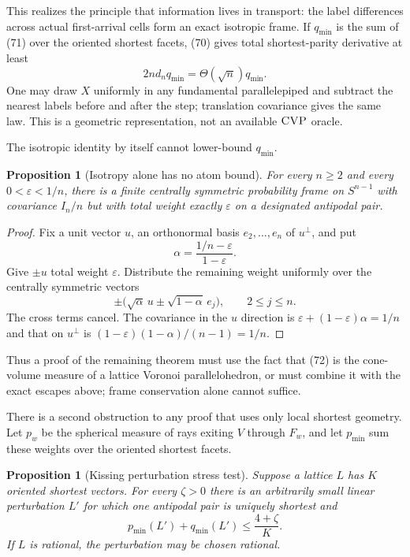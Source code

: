 \documentclass[10pt]{article}
\newtheorem{proposition}[theorem]{Proposition}
\theoremstyle{definition}
\newcommand{\CVP}{\textnormal{\textsc{CVP}}}
\begin{document}
This realizes the principle that information lives in transport: the label
differences across actual first-arrival cells form an exact isotropic frame.
If $q_{\min}$ is the sum of (71) over the oriented shortest facets, (70)
gives total shortest-parity derivative at least
\[
 2nd_nq_{\min}=\Theta(\sqrt n)q_{\min}.                         \tag{74}
\]
One may draw $X$ uniformly in any fundamental parallelepiped and subtract
the nearest labels before and after the step; translation covariance gives
the same law.  This is a geometric representation, not an available $\CVP$
oracle.

The isotropic identity by itself cannot lower-bound $q_{\min}$.

\begin{proposition}[Isotropy alone has no atom bound]           \label{prop:isotropy-limit}
For every $n\ge2$ and every $0<\varepsilon<1/n$, there is a finite centrally
symmetric probability frame on $S^{n-1}$ with covariance $I_n/n$ but with
total weight exactly $\varepsilon$ on a designated antipodal pair.
\end{proposition}

\begin{proof}
Fix a unit vector $u$, an orthonormal basis $e_2,\ldots,e_n$ of $u^\perp$,
and put
\[
 \alpha=\frac{1/n-\varepsilon}{1-\varepsilon}.
\]
Give $\pm u$ total weight $\varepsilon$.  Distribute the remaining weight
uniformly over the centrally symmetric vectors
\[
 \pm\bigl(\sqrt\alpha\,u\pm\sqrt{1-\alpha}\,e_j\bigr),
 \qquad 2\le j\le n.
\]
The cross terms cancel.  The covariance in the $u$ direction is
$\varepsilon+(1-\varepsilon)\alpha=1/n$ and that on $u^\perp$ is
$(1-\varepsilon)(1-\alpha)/(n-1)=1/n$.
\end{proof}

Thus a proof of the remaining theorem must use the fact that (72) is the
cone-volume measure of a lattice Voronoi parallelohedron, or must combine it
with the exact escapes above; frame conservation alone cannot suffice.

There is a second obstruction to any proof that uses only local shortest
geometry.  Let $p_w$ be the spherical measure of rays exiting $V$ through
$F_w$, and let $p_{\min}$ sum these weights over the oriented shortest
facets.

\begin{proposition}[Kissing perturbation stress test]           \label{prop:kissing-stress}
Suppose a lattice $L$ has $K$ oriented shortest vectors.  For every
$\zeta>0$ there is an arbitrarily small linear perturbation $L'$ for which
one antipodal pair is uniquely shortest and
\[
 p_{\min}(L')+q_{\min}(L')\le\frac{4+\zeta}{K}.
\]
If $L$ is rational, the perturbation may be chosen rational.
\end{proposition}
\end{document}
